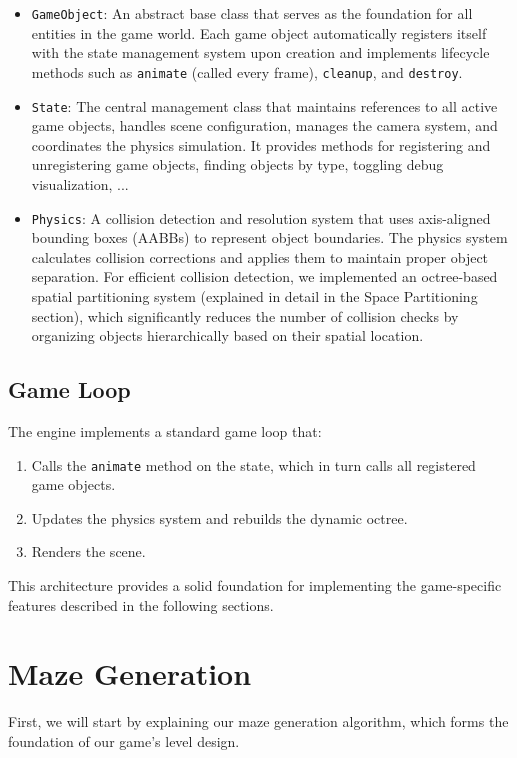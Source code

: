 \documentclass{article}
\begin{document}
\begin{itemize}
    \item \texttt{GameObject}: An abstract base class that serves as the foundation for all entities in the game world. Each game object automatically registers itself with the state management system upon creation and implements lifecycle methods such as \texttt{animate} (called every frame), \texttt{cleanup}, and \texttt{destroy}.
    
    \item \texttt{State}: The central management class that maintains references to all active game objects, handles scene configuration, manages the camera system, and coordinates the physics simulation. It provides methods for registering and unregistering game objects, finding objects by type, toggling debug visualization, ...
    
    \item \texttt{Physics}: A collision detection and resolution system that uses axis-aligned bounding boxes (AABBs) to represent object boundaries. The physics system calculates collision corrections and applies them to maintain proper object separation. For efficient collision detection, we implemented an octree-based spatial partitioning system (explained in detail in the Space Partitioning section), which significantly reduces the number of collision checks by organizing objects hierarchically based on their spatial location.
\end{itemize}

\subsection{Game Loop}
The engine implements a standard game loop that:

\begin{enumerate}
    \item Calls the \texttt{animate} method on the state, which in turn calls all registered game objects.
    \item Updates the physics system and rebuilds the dynamic octree.
    \item Renders the scene.
\end{enumerate}

This architecture provides a solid foundation for implementing the game-specific features described in the following sections.

\section{Maze Generation}
First, we will start by explaining our maze generation algorithm, which forms the foundation of our game's level design.
\end{document}
